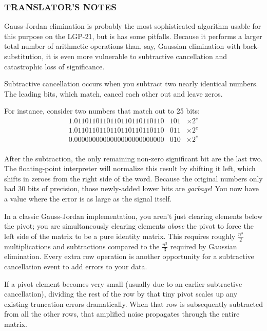 \documentclass{article}
\begin{document}
\subsubsection*{TRANSLATOR'S NOTES}
Gauss-Jordan elimination is probably the most sophisticated algorithm usable for this purpose on the LGP-21, but is has some pitfalls. Because it performs a larger total number of arithmetic operations than, say, Gaussian elimination with back-substitution, it is even more vulnerable to subtractive cancellation and catastrophic loss of significance.

Subtractive cancellation occurs when you subtract two nearly identical numbers. The leading bits, which match, cancel each other out and leave zeros.

For instance, consider two numbers that match out to 25 bits:
$$\begin{array}{rcc}
1.0110110110110110110110110 & 101 & \times 2^e \\

1.0110110110110110110110110 & 011 & \times 2^e \\
\hline
0.0000000000000000000000000 & 010 & \times 2^e \\
\end{array}$$

After the subtraction, the only remaining non-zero significant bit are the last two. The floating-point interpreter will normalize this result by shifting it left, which shifts in zeroes from the right side of the word. Because the original numbers only had 30 bits of precision, those newly-added lower bits are \emph{garbage}! You now have a value where the error is as large as the signal itself.

In a classic Gauss-Jordan implementation, you aren't just clearing elements below the pivot; you are simultaneously clearing elements \emph{above} the pivot to force the left side of the matrix to be a pure identity matrix. This requires roughly $\frac{n^3}{2}$ multiplications and subtractions compared to the $\frac{n^3}{3}$ required by Gaussian elimination. Every extra row operation is another opportunity for a subtractive cancellation event to add errors to your data.

If a pivot element becomes very small (usually due to an earlier subtractive cancellation), dividing the rest of the row by that tiny pivot scales up any existing truncation errors dramatically. When that row is subsequently subtracted from all the other rows, that amplified noise propagates through the entire matrix.
\end{document}
